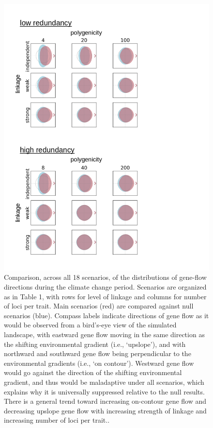 \documentclass[9pt,twocolumn,twoside,lineno]{pnas-new}
\begin{document}
\begin{figure}
\centering
\includegraphics[width=.8\linewidth]{pub/figs/FIG_2_gene_flow.jpg}
\caption{Comparison, across all 18 scenarios, of the distributions of gene-flow directions during the climate change period. Scenarios are organized as in Table 1, with rows for level of linkage and columns for number of loci per trait. Main scenarios (red) are compared against null scenarios (blue). Compass labels indicate directions of gene flow as it would be observed from a bird’s-eye view of the simulated landscape, with eastward gene flow moving in the same direction as the shifting environmental gradient (i.e., ‘upslope’), and with northward and southward gene flow being perpendicular to the environmental gradients (i.e., ‘on contour’). Westward gene flow would go against the direction of the shifting environmental gradient, and thus would be maladaptive under all scenarios, which explains why it is universally suppressed relative to the null results. There is a general trend toward increasing on-contour gene flow and decreasing upslope gene flow with increasing strength of linkage and increasing number of loci per trait..
}
\label{fig:fig_2}
\end{figure}
\end{document}
